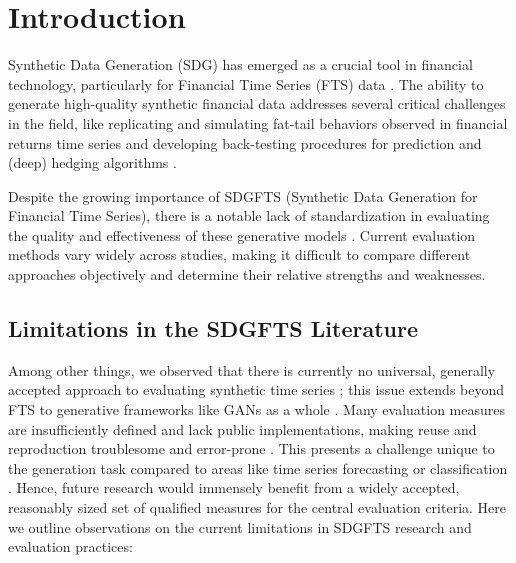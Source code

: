 \documentclass[sigconf]{acmart}
\begin{document}
\section{Introduction}
  Synthetic Data Generation (SDG) has emerged as a crucial tool in
  financial technology, particularly for Financial Time Series (FTS)
  data \cite{Potluru24}. The ability to generate high-quality
  synthetic financial data addresses several critical challenges in
  the field, like replicating and simulating fat-tail behaviors
  observed in financial returns time series and developing
  back-testing procedures for prediction and (deep) hedging
  algorithms \cite{Stenger24}.

  Despite the growing importance of SDGFTS (Synthetic Data 
  Generation for Financial Time Series), there is a notable lack 
  of standardization in evaluating the quality and effectiveness 
  of these generative models \cite{Stenger24}. Current evaluation 
  methods vary widely across studies, making it difficult to 
  compare different approaches objectively and determine their 
  relative strengths and weaknesses.

  \subsection{Limitations in the SDGFTS Literature}
    Among other things, we observed that there is currently no 
      universal, generally accepted approach to evaluating synthetic 
      time series \cite{Stenger24}; this issue extends beyond FTS 
      to generative frameworks like GANs as a whole \cite{Wang20}. 
      Many evaluation measures are insufficiently defined and lack 
      public implementations, making reuse and reproduction 
      troublesome and error-prone \cite{Stenger24}. This presents a 
      challenge unique to the generation task compared to areas like 
      time series forecasting or classification \cite{Stenger24}. 
      Hence, future research would immensely benefit from a widely 
      accepted, reasonably sized set of qualified measures for the 
      central evaluation criteria. Here we outline observations on 
      the current limitations in SDGFTS research and evaluation 
      practices:
      
\end{document}
